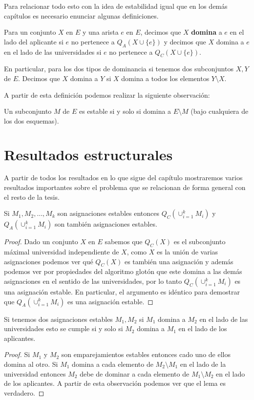 Para relacionar todo esto con la idea de estabilidad igual que en los demás capítulos es necesario enunciar algunas definiciones.

\begin{dfn}
Para un conjunto $X$ en $E$ y una arista $e$ en $E$, decimos que $X$ \textbf{domina} a $e$ en el lado del aplicante si $e$ no pertenece a $Q_A(X \cup \{e\})$ y decimos que $X$ domina a $e$ en el lado de las universidades si $e$ no pertenece a $Q_C(X \cup \{e\})$.

En particular, para los dos tipos de dominancia si tenemos dos subconjuntos $X,Y$ de $E$. Decimos que $X$ domina a $Y$ si $X$ domina a todos los elementos $Y \setminus X$.
\end{dfn}

A partir de esta definición podemos realizar la siguiente observación:

\begin{obs}
Un subconjunto $M$ de $E$ es estable si y solo si domina a $E\setminus M$ (bajo cualquiera de los dos esquemas).
\end{obs}

\section{Resultados estructurales}

A partir de todos los resultados en lo que sigue del capítulo mostraremos varios resultados importantes sobre el problema que se relacionan de forma general con el resto de la tesis. 

\begin{teo}
\label{union de estables}
Si $M_1,M_2,\dots,M_k$ son asignaciones estables entonces $Q_C( \cup_{i=1}^k M_i)$ y $Q_A( \cup_{i=1}^k M_i)$ son también asignaciones estables. 
\end{teo}
\begin{proof}
Dado un conjunto $X$ en $E$ sabemos que $Q_C(X)$ es el subconjunto máximal universidad independiente de $X$, como $X$ es la unión de varias asignaciones podemos ver qué $Q_C(X)$ es también una asignación y además podemos ver por propiedades del algoritmo glotón que este domina a las demás asignaciones en el sentido de las universidades, por lo tanto $Q_C( \cup_{i=1}^k M_i)$ es una asignación estable. En particular, el argumento es idéntico para demostrar que $Q_A( \cup_{i=1}^k M_i)$ es una asignación estable. 
\end{proof}

\begin{lem}
\label{desigualdad}
Si tenemos dos asignaciones estables $M_1,M_2$ si $M_1$ domina a $M_2$ en el lado de las universidades esto se cumple si y solo si $M_2$ domina a $M_1$ en el lado de los aplicantes.
\end{lem}
\begin{proof}
Si $M_1$ y $M_2$ son emparejamientos estables entonces cado uno de ellos domina al otro. Si $M_1$ domina a cada elemento de $M_2 \setminus M_1$ en el lado de la universidad entonces $M_2$ debe de dominar a cada elemento de $M_1 \setminus M_2$ en el lado de los aplicantes. A partir de esta observación podemos ver que el lema es verdadero.
\end{proof}

